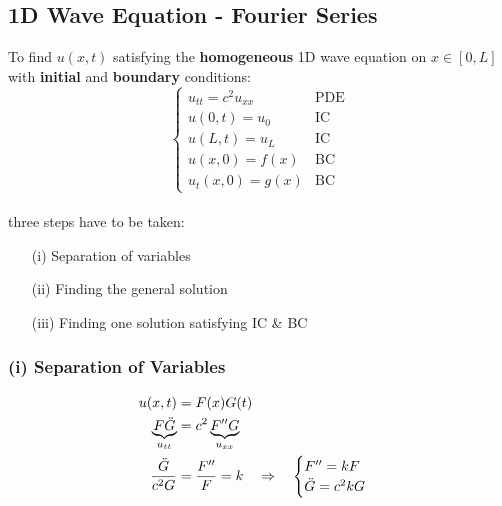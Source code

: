 \subsection{1D Wave Equation - Fourier Series}
To find $u(x,t)$ satisfying the \textbf{homogeneous} 1D wave equation on $x\in[0,L]$ with \textbf{initial} and 
\textbf{boundary} conditions:
\begin{equation*}
    \begin{cases} 
        u_{tt}=c^2u_{xx} & \text{PDE}\\
        u(0,t)=u_0 & \text{IC}\\ 
        u(L,t)=u_L & \text{IC}\\ 
        u(x,0)=f(x)& \text{BC}\\ 
        u_t(x,0)=g(x)& \text{BC}
    \end{cases}
\end{equation*}\\
three steps have to be taken:
\begin{itemize}
    \item[(i)] Separation of variables
    \item[(ii)] Finding the general solution
    \item[(iii)] Finding one solution satisfying IC \& BC
\end{itemize}
%
%

\subsubsection{(i) Separation of Variables}
\begin{align*}
    u(x,t)&=F(x)G(t)\\
    \underbrace{F\ddot{G}}_{u_{tt}}&=c^2\underbrace{F''G}_{u_{xx}}\\
    \frac{\ddot{G}}{c^2G}&=\frac{F''}{F}=k\hspace*{10pt}\Rightarrow\hspace*{10pt}
    \begin{cases} 
        F''=kF\\
        \ddot{G}=c^2kG
    \end{cases}
\end{align*}
%
%
